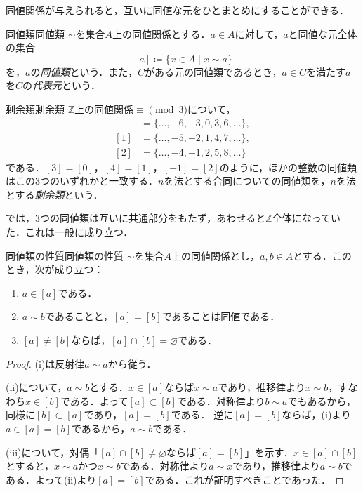 同値関係が与えられると，互いに同値な元をひとまとめにすることができる．

\begin{definition}{同値類}{同値類}
  $\sim$を集合$A$上の同値関係とする．$a \in A$に対して，$a$と同値な元全体の集合
  \[
    [a] \coloneqq \{ x \in A \mid x \sim a \}
  \]
  を，$a$の\emph{同値類}という．また，$C$がある元の同値類であるとき，$a \in C$を満たす$a$を$C$の\emph{代表元}という．
\end{definition}

\begin{example}{剰余類}{剰余類}
  $\mathbb{Z}$上の同値関係$\equiv \pmod{3}$について，
  \begin{align*}
    [0] & = \{ \ldots, -6, -3, 0, 3, 6, \ldots \}, \\
    [1] & = \{ \ldots, -5, -2, 1, 4, 7, \ldots \}, \\
    [2] & = \{ \ldots, -4, -1, 2, 5, 8, \ldots \}
  \end{align*}
  である．$[3] = [0]$，$[4] = [1]$，$[-1] = [2]$のように，ほかの整数の同値類はこの$3$つのいずれかと一致する．$n$を法とする合同についての同値類を，$n$を法とする\emph{剰余類}という．
\end{example}

では，$3$つの同値類は互いに共通部分をもたず，あわせると$\mathbb{Z}$全体になっていた．これは一般に成り立つ．

\begin{prop}{同値類の性質}{同値類の性質}
  $\sim$を集合$A$上の同値関係とし，$a, b \in A$とする．このとき，次が成り立つ：
  \begin{enumerate}[label=(\roman*),leftmargin=3.2em]
    \item $a \in [a]$である．
    \item $a \sim b$であることと，$[a] = [b]$であることは同値である．
    \item $[a] \ne [b]$ならば，$[a] \cap [b] = \varnothing$である．
  \end{enumerate}
\end{prop}

\begin{tleftbar}
  \begin{proof}
    (i)は反射律$a \sim a$から従う．

    (ii)について，$a \sim b$とする．$x \in [a]$ならば$x \sim a$であり，推移律より$x \sim b$，すなわち$x \in [b]$である．よって$[a] \subset [b]$である．対称律より$b \sim a$でもあるから，同様に$[b] \subset [a]$であり，$[a] = [b]$である．
    逆に$[a] = [b]$ならば，(i)より$a \in [a] = [b]$であるから，$a \sim b$である．

    (iii)について，対偶「$[a] \cap [b] \ne \varnothing$ならば$[a] = [b]$」を示す．$x \in [a] \cap [b]$とすると，$x \sim a$かつ$x \sim b$である．対称律より$a \sim x$であり，推移律より$a \sim b$である．よって(ii)より$[a] = [b]$である．これが証明すべきことであった．
  \end{proof}
\end{tleftbar}

